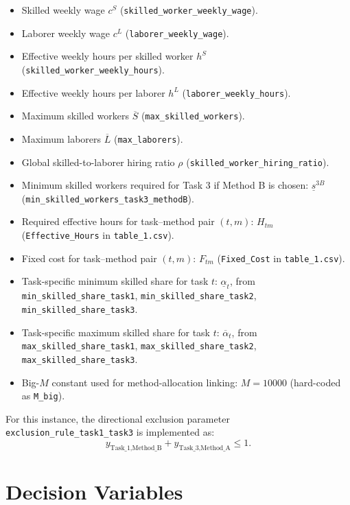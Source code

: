 \begin{itemize}
    \item Skilled weekly wage $c^S$ (\texttt{skilled\_worker\_weekly\_wage}).
    \item Laborer weekly wage $c^L$ (\texttt{laborer\_weekly\_wage}).
    \item Effective weekly hours per skilled worker $h^S$ (\texttt{skilled\_worker\_weekly\_hours}).
    \item Effective weekly hours per laborer $h^L$ (\texttt{laborer\_weekly\_hours}).
    \item Maximum skilled workers $\overline S$ (\texttt{max\_skilled\_workers}).
    \item Maximum laborers $\overline L$ (\texttt{max\_laborers}).
    \item Global skilled-to-laborer hiring ratio $\rho$ (\texttt{skilled\_worker\_hiring\_ratio}).
    \item Minimum skilled workers required for Task 3 if Method B is chosen:
    $\underline s^{3B}$ (\texttt{min\_skilled\_workers\_task3\_methodB}).
    \item Required effective hours for task--method pair $(t,m)$:
    $H_{tm}$ (\texttt{Effective\_Hours} in \texttt{table\_1.csv}).
    \item Fixed cost for task--method pair $(t,m)$:
    $F_{tm}$ (\texttt{Fixed\_Cost} in \texttt{table\_1.csv}).
    \item Task-specific minimum skilled share for task $t$:
    $\underline \alpha_t$, from
    \texttt{min\_skilled\_share\_task1},
    \texttt{min\_skilled\_share\_task2},
    \texttt{min\_skilled\_share\_task3}.
    \item Task-specific maximum skilled share for task $t$:
    $\overline \alpha_t$, from
    \texttt{max\_skilled\_share\_task1},
    \texttt{max\_skilled\_share\_task2},
    \texttt{max\_skilled\_share\_task3}.
    \item Big-$M$ constant used for method-allocation linking:
    $M=10000$ (hard-coded as \texttt{M\_big}).
\end{itemize}

For this instance, the directional exclusion parameter \texttt{exclusion\_rule\_task1\_task3} is implemented as:
\[
y_{\text{Task\_1},\text{Method\_B}} + y_{\text{Task\_3},\text{Method\_A}} \le 1.
\]

\section*{Decision Variables}

